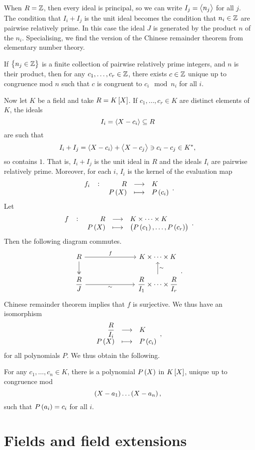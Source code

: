 When $ R = \mathbb{Z} $, then every ideal is principal, so we can write $ I_j = \left\langle n_j \right\rangle $ for all $ j $. The condition that $ I_i + I_j $ is the unit ideal becomes the condition that $ n_i \in \mathbb{Z} $ are pairwise relatively prime. In this case the ideal $ J $ is generated by the product $ n $ of the $ n_i $. Specialising, we find the version of the Chinese remainder theorem from elementary number theory.

\begin{theorem}
If $ \cbr{n_j \in \Z} $ is a finite collection of pairwise relatively prime integers, and $ n $ is their product, then for any $ c_1, \dots, c_r \in \mathbb{Z} $, there exists $ c \in \mathbb{Z} $ unique up to congruence mod $ n $ such that $ c $ is congruent to $ c_i \mod n_i $ for all $ i $.
\end{theorem}

Now let $ K $ be a field and take $ R = K\sbr{X} $. If $ c_1, \dots, c_r \in K $ are distinct elements of $ K $, the ideals
$$ I_i = \left\langle X - c_i \right\rangle \subseteq R $$
are such that
$$ I_i + I_j = \left\langle X - c_i \right\rangle + \left\langle X - c_j \right\rangle \ni c_i - c_j \in K^*, $$
so contains $ 1 $. That is, $ I_i + I_j $ is the unit ideal in $ R $ and the ideals $ I_i $ are pairwise relatively prime. Moreover, for each $ i $, $ I_i $ is the kernel of the evaluation map
$$ \function[f_i]{R}{K}{P\br{X}}{P\br{c_i}}. $$
Let
$$ \function[f]{R}{K \times \dots \times K}{P\br{X}}{\br{P\br{c_1}, \dots, P\br{c_r}}}. $$
Then the following diagram commutes.
$$
\begin{tikzcd}[column sep=1in]
R \arrow{r}{f} \arrow[twoheadrightarrow]{d} & K \times \dots \times K \\
\dfrac{R}{J} \arrow[swap]{r}{\sim} & \dfrac{R}{I_1} \times \dots \times \dfrac{R}{I_r} \arrow[swap]{u}{\sim}
\end{tikzcd}.
$$
Chinese remainder theorem implies that $ f $ is surjective. We thus have an isomorphism
$$ \function{\dfrac{R}{I_i}}{K}{P\br{X}}{P\br{c_i}}, $$
for all polynomials $ P $. We thus obtain the following.

\begin{theorem}
For any $ c_1, \dots, c_n \in K $, there is a polynomial $ P\br{X} $ in $ K\sbr{X} $, unique up to congruence mod
$$ \br{X - a_1} \dots \br{X - a_n}, $$
such that $ P\br{a_i} = c_i $ for all $ i $.
\end{theorem}

\pagebreak

\section{Fields and field extensions}

